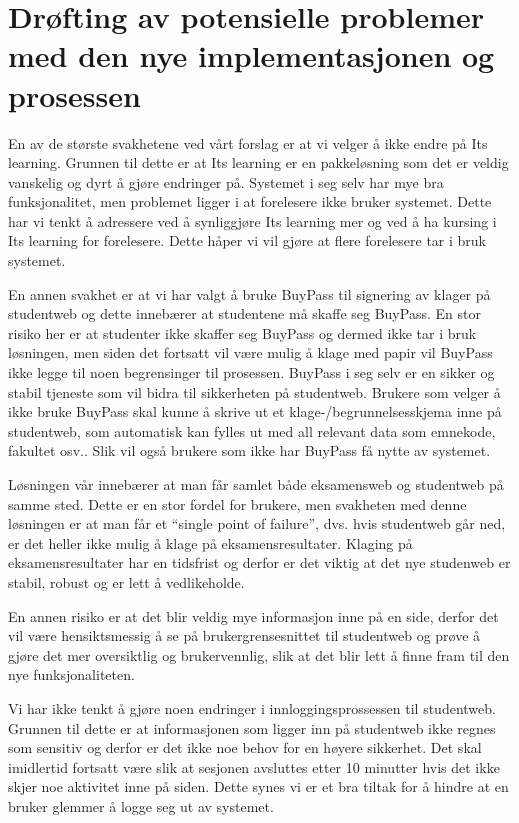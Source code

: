 
\section{Drøfting av potensielle problemer med den nye implementasjonen og prosessen}


En av de største svakhetene ved vårt forslag er at vi velger å ikke endre på Its learning. Grunnen til dette er at Its learning er en pakkeløsning som det er veldig vanskelig og dyrt å gjøre endringer på. Systemet i seg selv har mye bra funksjonalitet, men problemet ligger i at forelesere ikke bruker systemet. Dette har vi tenkt å adressere ved å synliggjøre Its learning mer og ved å ha kursing i Its learning for forelesere. Dette håper vi vil gjøre at flere forelesere tar i bruk systemet.

En annen svakhet er at vi har valgt å bruke BuyPass til signering av klager på studentweb og dette innebærer at studentene må skaffe seg BuyPass. En stor risiko her er at studenter ikke skaffer seg BuyPass og dermed ikke tar i bruk løsningen, men siden det fortsatt vil være mulig å klage med papir vil BuyPass ikke legge til noen begrensinger til prosessen. BuyPass i seg selv er en sikker og stabil tjeneste som vil bidra til sikkerheten på studentweb. Brukere som velger å ikke bruke BuyPass skal kunne å skrive ut et klage-/begrunnelsesskjema inne på studentweb, som automatisk kan fylles ut med all relevant data som emnekode, fakultet osv.. Slik vil også brukere som ikke har BuyPass få nytte av systemet. 

Løsningen vår innebærer at man får samlet både eksamensweb og studentweb på samme sted. Dette er en stor fordel for brukere, men svakheten med denne løsningen er at man får et “single point of failure”, dvs. hvis studentweb går ned, er det heller ikke mulig å klage på eksamensresultater. Klaging på eksamensresultater har en tidsfrist og derfor er det viktig at det nye studenweb er stabil, robust og er lett å vedlikeholde.

En annen risiko er at det blir veldig mye informasjon inne på en side, derfor det vil være hensiktsmessig å se på brukergrensesnittet til studentweb og prøve å gjøre det mer oversiktlig og brukervennlig, slik at det blir lett å finne fram til den nye funksjonaliteten.
 	 	 	
Vi har ikke tenkt å gjøre noen endringer i innloggingsprossessen til studentweb. Grunnen til dette er at informasjonen som ligger inn på studentweb ikke regnes som sensitiv og derfor er det ikke noe behov for en høyere sikkerhet. Det skal imidlertid fortsatt være slik at sesjonen avsluttes etter 10 minutter hvis det ikke skjer noe aktivitet inne på siden. Dette synes vi er et bra tiltak for å hindre at en bruker glemmer å logge seg ut av systemet.


